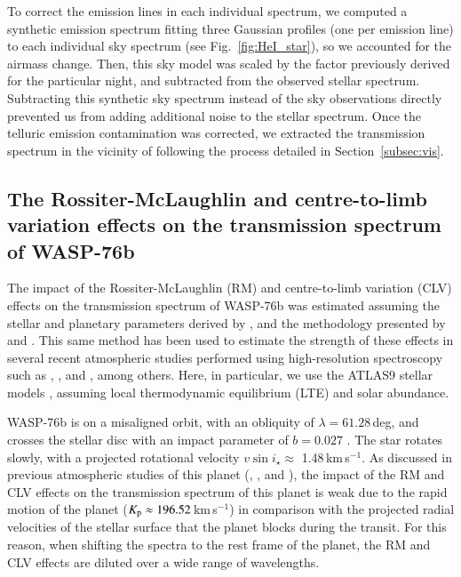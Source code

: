 \documentclass{aa}
\begin{document}
To correct the emission lines in each individual spectrum, we computed a synthetic emission spectrum fitting three Gaussian profiles (one per emission line) to each individual sky spectrum (see Fig.~\ref{fig:HeI_star}), so we accounted for the airmass change. Then, this sky model was scaled by the factor previously derived for the particular night, and subtracted from the observed stellar spectrum. Subtracting this synthetic sky spectrum instead of the sky observations directly prevented us from adding additional noise to the stellar spectrum. Once the telluric emission contamination was corrected, we extracted the transmission spectrum in the vicinity of  following the process detailed in Section~\ref{subsec:vis}. 



\subsection{The Rossiter-McLaughlin and centre-to-limb variation effects on the transmission spectrum of WASP-76b}

The impact of the Rossiter-McLaughlin (RM) and centre-to-limb variation (CLV) effects on the transmission spectrum of WASP-76b was estimated assuming the stellar and planetary parameters derived by \citet{Ehrenreich2020}, and the methodology presented by \citet{Yan2017A&A...603A..73Y} and \citet{YanKELT9}. This same method has been used to estimate the strength of these effects in several recent atmospheric studies performed using high-resolution spectroscopy such as \citet{Borsa2020}, \citet{Casasayas2020}, and \citet{Chen2020}, among others. Here, in particular, we use the ATLAS9 stellar models \citep{ATLAS92003}, assuming local thermodynamic equilibrium (LTE) and solar abundance. 

WASP-76b is on a misaligned orbit, with an obliquity of $\lambda=61.28$\,deg, and crosses the stellar disc with an impact parameter of $b=0.027$ \citep{Ehrenreich2020}. The star rotates slowly, with a projected rotational velocity $v\sin i_{\star} \approx$ 1.48\,km\,s$^{-1}$. As discussed in previous atmospheric studies of this planet (\citealt{Seidel2019}, \citealt{Ehrenreich2020}, and \citealt{Tabernero2020}), the impact of the RM and CLV effects on the transmission spectrum of this planet is weak due to the rapid motion of the planet ($K_{\rm p} \approx 196.52$\,km\,s$^{-1}$) in comparison with the projected radial velocities of the stellar surface that the planet blocks during the transit. For this reason, when shifting the spectra to the rest frame of the planet, the RM and CLV effects are diluted over a wide range of wavelengths. 
\end{document}
